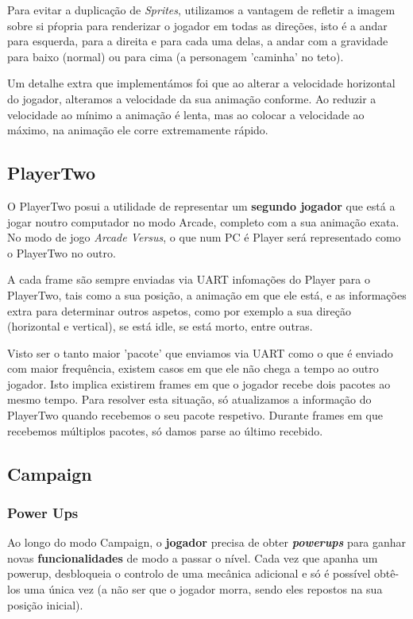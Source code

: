 \documentclass{report}
\begin{document}
Para evitar a duplicação de \textit{Sprites}, utilizamos a vantagem de refletir a imagem sobre si pŕopria para renderizar o jogador em todas as direções, isto é a andar para esquerda, para a direita e para cada uma delas, a andar com a gravidade para baixo (normal) ou para cima (a personagem 'caminha' no teto).

Um detalhe extra que implementámos foi que ao alterar a velocidade horizontal do jogador, alteramos a velocidade da sua animação conforme. Ao reduzir a velocidade ao mínimo a animação é lenta, mas ao colocar a velocidade ao máximo, na animação ele corre extremamente rápido.

\subsection{PlayerTwo}

O PlayerTwo posui a utilidade de representar um \textbf{segundo jogador} que está a jogar noutro computador no modo Arcade, completo com a sua animação exata. No modo de jogo \textit{Arcade Versus}, o que num PC é Player será representado como o PlayerTwo no outro.

A cada frame são sempre enviadas via UART infomações do Player para o PlayerTwo, tais como a sua posição, a animação em que ele está, e as informações extra para determinar outros aspetos, como por exemplo a sua direção (horizontal e vertical), se está idle, se está morto, entre outras. 

Visto ser o tanto maior 'pacote' que enviamos via UART como o que é enviado com maior frequência, existem casos em que ele não chega a tempo ao outro jogador. Isto implica existirem frames em que o jogador recebe dois pacotes ao mesmo tempo. Para resolver esta situação, só atualizamos a informação do PlayerTwo quando recebemos o seu pacote respetivo. Durante frames em que recebemos múltiplos pacotes, só damos parse ao último recebido.

\subsection{Campaign}

\subsubsection{Power Ups}

Ao longo do modo Campaign, o \textbf{jogador} precisa de obter \textbf{\textit{powerups}} para ganhar novas \textbf{funcionalidades} de modo a passar o nível. Cada vez que apanha um powerup, desbloqueia o controlo de uma mecânica adicional e só é possível obtê-los uma única vez (a não ser que o jogador morra, sendo eles repostos na sua posição inicial).
\end{document}
